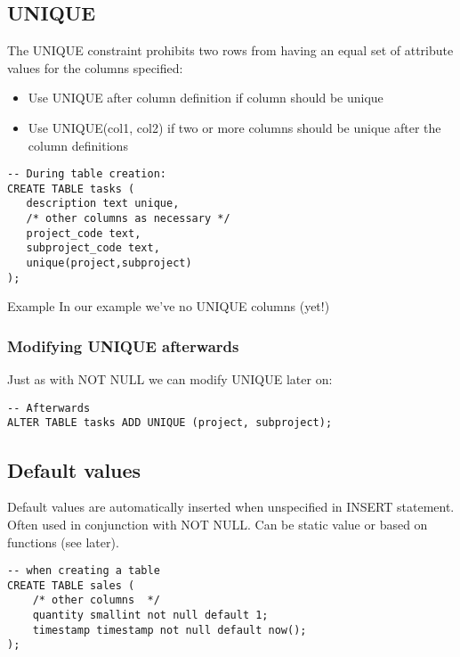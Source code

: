 \documentclass[slides]{pgnotes}
\begin{document}
\subsection{UNIQUE}\label{unique}

The UNIQUE constraint prohibits two rows from having an equal set of
attribute values for the columns specified:

\begin{itemize}
\item Use UNIQUE after column definition if column should be unique
\item Use UNIQUE(col1, col2) if two or more columns should be unique after the column definitions
\end{itemize}

\newpage

\begin{verbatim}
-- During table creation:
CREATE TABLE tasks (
   description text unique,
   /* other columns as necessary */
   project_code text,
   subproject_code text,
   unique(project,subproject)
); 
\end{verbatim}

\begin{greenbox}{Example}
  In our example we've no UNIQUE columns (yet!)
\end{greenbox}

\newpage
\subsubsection{Modifying UNIQUE afterwards}

Just as with NOT NULL we can modify UNIQUE later on:

\begin{verbatim}
-- Afterwards
ALTER TABLE tasks ADD UNIQUE (project, subproject);
\end{verbatim}


\subsection{Default values}
\label{sec:default-values}

Default values are automatically inserted when unspecified in INSERT
statement.
Often used in conjunction with NOT NULL.
Can be static value or based on functions (see later).

\begin{verbatim}
-- when creating a table
CREATE TABLE sales (
    /* other columns  */
    quantity smallint not null default 1;
    timestamp timestamp not null default now(); 
);
\end{verbatim}
\end{document}
